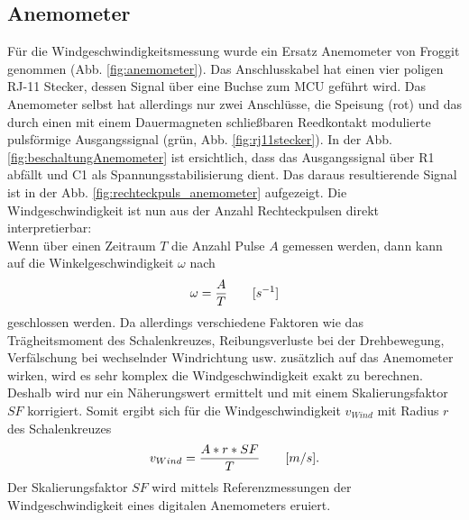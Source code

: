 \subsection{Anemometer}
{\begin{minipage}[b][650pt][t]{0.55\textwidth}
Für die Windgeschwindigkeitsmessung wurde ein Ersatz Anemometer von Froggit genommen (Abb. \ref{fig:anemometer}). Das Anschlusskabel hat einen vier poligen RJ-11 Stecker, dessen Signal über eine Buchse zum MCU geführt wird. Das Anemometer selbst hat allerdings nur zwei Anschlüsse, die Speisung (rot) und das durch einen mit einem Dauermagneten schließbaren Reedkontakt modulierte pulsförmige Ausgangssignal (grün, Abb. \ref{fig:rj11stecker}). In der Abb. \ref{fig:beschaltungAnemometer} ist ersichtlich, dass das Ausgangssignal über R1 abfällt und C1 als Spannungsstabilisierung dient. Das daraus resultierende Signal ist in der Abb. \ref{fig:rechteckpuls_anemometer} aufgezeigt. Die Windgeschwindigkeit ist nun aus der Anzahl Rechteckpulsen direkt interpretierbar:\\

Wenn über einen Zeitraum $T$ die Anzahl Pulse $A$ gemessen werden, dann kann auf die Winkelgeschwindigkeit $\omega$ nach 
\begin{equation}
\centering
\omega=\frac{A}{T}\qquad[s^{-1}]
\end{equation}
geschlossen werden. Da allerdings verschiedene Faktoren wie das Trägheitsmoment des Schalenkreuzes, Reibungsverluste bei der Drehbewegung, Verfälschung bei wechselnder Windrichtung usw. zusätzlich auf das Anemometer wirken, wird es sehr komplex die Windgeschwindigkeit exakt zu berechnen. Deshalb wird nur ein Näherungswert ermittelt und mit einem Skalierungsfaktor $SF$ korrigiert. Somit ergibt sich für die Windgeschwindigkeit $v_{Wind}$ mit Radius $r$ des Schalenkreuzes
\begin{equation}
\centering
v_{Wind} = \frac{A*r*SF}{T}\qquad[m/s].
\label{equ:berechnungWindgeschwindigkeit}
\end{equation}
Der Skalierungsfaktor $SF$ wird mittels Referenzmessungen der Windgeschwindigkeit eines digitalen Anemometers eruiert. \\
\end{minipage}}
